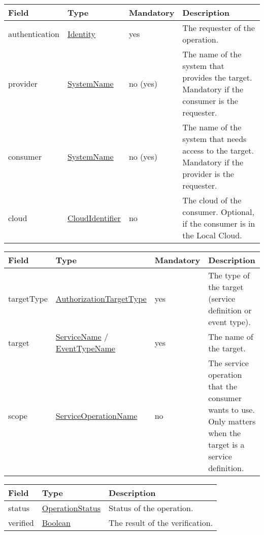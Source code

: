 \documentclass[a4paper]{arrowhead}
\newcommand{\pref}[1]{{\textcolor{ArrowheadGrey}{\hyperref[sec:model:primitives:#1]{#1}}}}
\begin{document}

\begin{table}[ht!]
\begin{tabularx}{\textwidth}{| p{3cm} | p{4cm} | p{2cm} | X |} \hline
\rowcolor{gray!33} Field & Type & Mandatory & Description \\ \hline
authentication &\hyperref[sec:model:Identity]{Identity} & yes & The requester of the operation. \\ \hline
provider & \pref{SystemName} & no (yes) & The name of the system that provides the target. Mandatory if the consumer is the requester. \\ \hline
consumer & \pref{SystemName} & no (yes) & The name of the system that needs access to the target. Mandatory if the provider is the requester. \\ \hline
cloud & \pref{CloudIdentifier} & no & The cloud of the consumer. Optional, if the consumer is in the Local Cloud. \\ \hline
\end{tabularx}
\end{table}

\begin{table}[ht!]
\begin{tabularx}{\textwidth}{| p{3cm} | p{4cm} | p{2cm} | X |} \hline
\rowcolor{gray!33} Field & Type & Mandatory & Description \\ \hline
targetType & \pref{AuthorizationTargetType} & yes & The type of the target (service definition or event type). \\ \hline
target & \pref{ServiceName} / \pref{EventTypeName} & yes & The name of the target. \\ \hline
scope & \pref{ServiceOperationName} & no & The service operation that the consumer wants to use. Only matters when the target is a service definition. \\ \hline
\end{tabularx}
\end{table}

 
\begin{table}[ht!]
\begin{tabularx}{\textwidth}{| p{4.25cm} | p{4cm} | X |} \hline
\rowcolor{gray!33} Field & Type      & Description \\ \hline
status & \pref{OperationStatus} & Status of the operation. \\ \hline
verified & \pref{Boolean} & The result of the verification. \\ \hline
\end{tabularx}
\end{table}
\end{document}
